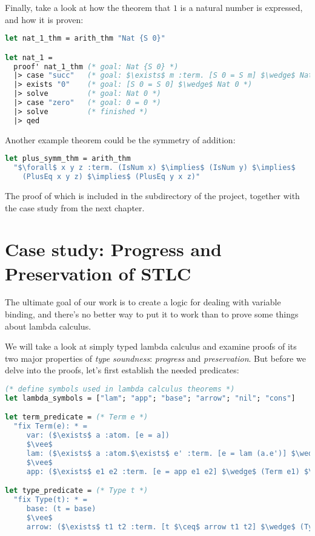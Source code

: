 \documentclass[english, mgr]{iithesis}
\newcommand{\lstt}[1]{\text{{\lstinline[columns=fixed,mathescape]|#1|}}}
\renewcommand{\it}[1]{\textit{#1}}
\begin{document}
\newpage

Finally, take a look at how the theorem that $1$ is a natural number is expressed,
and how it is proven:
\begin{lstlisting}[mathescape, language=OCaml, escapebegin=\color{codegreen}]
let nat_1_thm = arith_thm "Nat {S 0}"

let nat_1 =
  proof' nat_1_thm (* goal: Nat {S 0} *)
  |> case "succ"   (* goal: $\exists$ m :term. [S 0 = S m] $\wedge$ Nat m *)
  |> exists "0"    (* goal: [S 0 = S 0] $\wedge$ Nat 0 *)
  |> solve         (* goal: Nat 0 *)
  |> case "zero"   (* goal: 0 = 0 *)
  |> solve         (* finished *)
  |> qed
\end{lstlisting}
Another example theorem could be the symmetry of addition:
\begin{lstlisting}[mathescape, language=OCaml, escapebegin=\color{codepurple}]
let plus_symm_thm = arith_thm
  "$\forall$ x y z :term. (IsNum x) $\implies$ (IsNum y) $\implies$
    (PlusEq x y z) $\implies$ (PlusEq y x z)"
\end{lstlisting}
The proof of which is included in the \lstt{examples} subdirectory of the project,
together with the case study from the next chapter.
\chapter{Case study: Progress and Preservation of STLC}
The ultimate goal of our work is to create a logic for dealing with variable binding,
and there's no better way to put it to work than to prove some things about lambda calculus.

We will take a look at simply typed lambda calculus and examine proofs of
its two major properties of \it{type soundness}: \it{progress} and \it{preservation}.
But before we delve into the proofs, let's first establish the needed predicates:
\begin{lstlisting}[mathescape,language=OCaml, escapebegin=\color{codepurple}]
(* define symbols used in lambda calculus theorems *)
let lambda_symbols = ["lam"; "app"; "base"; "arrow"; "nil"; "cons"]

let term_predicate = (* Term e *)
  "fix Term(e): * =
     var: ($\exists$ a :atom. [e = a])
     $\vee$
     lam: ($\exists$ a :atom.$\exists$ e' :term. [e = lam (a.e')] $\wedge$ (Term e'))
     $\vee$
     app: ($\exists$ e1 e2 :term. [e = app e1 e2] $\wedge$ (Term e1) $\wedge$ (Term e2))"

let type_predicate = (* Type t *)
  "fix Type(t): * =
     base: (t = base)
     $\vee$
     arrow: ($\exists$ t1 t2 :term. [t $\ceq$ arrow t1 t2] $\wedge$ (Type t1) $\wedge$ (Type t2))"
\end{lstlisting}
\end{document}

